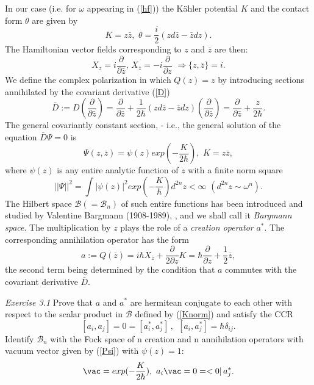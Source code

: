 In our case (i.e. for $\omega$ appearing in (\ref{hf})) the K\"ahler potential $K$ and the contact form $\theta$ are given by
\begin{equation}
\label{Ktheta}
K = z \bar z, \, \, \theta = \frac{i}{2}(zd\bar z - \bar z dz).
\end{equation}
The Hamiltonian vector fields corresponding to $z$ and $\bar{z}$ are then:
\begin{equation}
\label{z/bar}
X_z=i\frac{\partial}{\partial{\bar z}}, \, X_{\bar z}=
-i\frac{\partial}{\partial z} \, \, \Rightarrow \{z,\bar z\} = i.
\end{equation} 
We define the complex polarization in which $Q(z) = z$ by introducing sections annihilated by the covariant derivative (\ref{D})
\begin{equation}
\label{Dbar}
\bar D:= D(\frac{\partial}{\partial{\bar z}}) = 
\frac{\partial}{\partial{\bar z}} + \frac{1}{2\hbar}(zd\bar z - \bar z dz) 
(\frac{\partial}{\partial{\bar z}} ) = \frac{\partial}{\partial{\bar z}}  + 
\frac{z}{2\hbar}. 
\end{equation}
The general covariantly constant section, - i.e., the general solution of
the equation  $\bar D \Psi = 0$ is
\begin{equation}
\label{Psi}
\Psi (z, \bar z) = \psi(z) exp(-\frac{K}{2\hbar}), \, \, K=z\bar z,  
\end{equation}
 where $\psi(z)$ is any entire analytic function of $z$ with a finite 
norm square
\begin{equation}
\label{Knorm}
||\Psi||^2 = \int |\psi(z)|^2 exp(-\frac{K}{\hbar})d^{2n}z < \infty \, \,
(d^{2n}z \sim \omega^n). 
\end{equation}
The Hilbert space ${\mathcal B}(= {\mathcal B}_n)$ of such entire functions 
has been introduced and studied by Valentine Bargmann (1908-1989), \cite{B61}, 
and we shall call it {\it Bargmann space}. The multiplication by $z$ plays 
the role of a {\it creation operator} $a^*$. The corresponding annihilation operator has the form 
\begin{equation}
\label{a}
a:=Q(\bar z)= i\hbar X_{\bar z} + \frac{\partial}{2 \partial z} K = 
\hbar\frac{\partial}{\partial z} + \frac{1}{2}\bar z,
\end{equation}
the second term being determined by the condition that $a$ commutes with the covariant derivative $\bar D$.

{\it Exercise 3.1} Prove that $a$ and $a^*$ are hermitean conjugate to each other with respect to the scalar product in ${\mathcal B}$ defined by (\ref{Knorm}) and satisfy the CCR
\begin{equation}
\label{aa*}
[a_i, a_j] =0 = [a^*_i, a^*_j] \,, \ \ [a_i, a^*_j] = \hbar\delta_{ij}.
\end{equation}
Identify ${\mathcal B}_n$ with the Fock space of n creation and n annihilation 
operators with vacuum vector given by (\ref{Psi}) with $\psi(z) = 1$:
\begin{equation}
\label{vac}
\vac = exp(-\frac{K}{2\hbar}), \, \, a_i\vac = 0 = <0|\, a_j^*.
\end{equation} 

